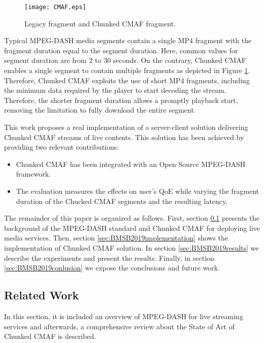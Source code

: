 \begin{figure}[htp]
	\centering
	\texttt{[image: CMAF.eps]}
	\caption{Legacy fragment and Chunked CMAF fragment.}
	\label{fig:BMSB2019fragment}
\end{figure}

Typical MPEG-DASH media segments contain a single MP4 fragment with the fragment duration equal to the segment duration. Here, common values for segment duration are from 2 to 30 seconds. On the contrary, Chunked CMAF enables a single segment to contain multiple fragments as depicted in Figure \ref{fig:BMSB2019fragment}. Therefore, Chunked CMAF exploits the use of short MP4 fragments, including the minimum data required by the player to start decoding the stream. Therefore, the shorter fragment duration allows a promptly playback start, removing the limitation to fully download the entire segment. 

This work proposes a real implementation of a server-client solution delivering Chunked CMAF streams of live contents. This solution has been achieved by providing two relevant contributions:
\begin{itemize}
	\item Chunked CMAF has been integrated with an Open Source MPEG-DASH framework.
	\item The evaluation measures the effects on user's QoE while varying the fragment duration of the Chucked CMAF segments and the resulting latency.
\end{itemize}

The remainder of this paper is organized as follows. First, section \ref{sec:BMSB2019related} presents the background of the MPEG-DASH standard and Chunked CMAF for deploying live media services. Then, section \ref{sec:BMSB2019implementation} shows the implementation of Chunked CMAF solution. In section \ref{sec:BMSB2019results} we describe the experiments and present the results. Finally, in section \ref{sec:BMSB2019conlusion} we expose the conclusions and future work.

\subsection{Related Work}
\label{sec:BMSB2019related}
In this section, it is included an overview of MPEG-DASH for live streaming services and afterwards, a comprehensive review about the State of Art of Chunked CMAF is described.

